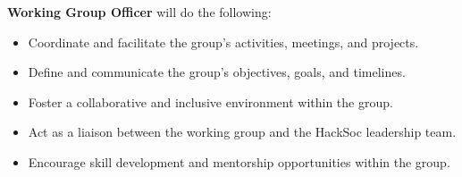 \begin{subclause}
	\textbf{Working Group Officer} will do the following:
	\begin{itemize}[label=--,topsep=0em,itemsep=0em]
        \item Coordinate and facilitate the group's activities, meetings, and projects.
        \item Define and communicate the group's objectives, goals, and timelines.
        \item Foster a collaborative and inclusive environment within the group.
        \item Act as a liaison between the working group and the HackSoc leadership team.
        \item Encourage skill development and mentorship opportunities within the group.
	\end{itemize}
\end{subclause}
